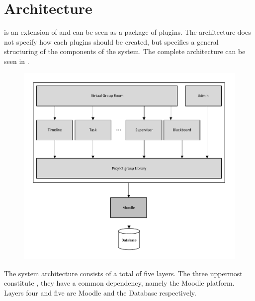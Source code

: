 \section{Architecture}
\label{sec:architecture}
\system{} is an extension of \moodle{} and can be seen as a package of plugins. 
The architecture does not specify how each plugins should be created, but specifies a general structuring of the components of the system. 
The complete architecture can be seen in .
\begin{figure}[h!t]
	\centering
		\includegraphics[width=\textwidth]{images/architecture.pdf}
	\label{fig:architecture}
\end{figure}

The system architecture consists of a total of five layers. 
The three uppermost constitute \system{}, they have a common dependency, namely the Moodle platform. 
Layers four and five are Moodle and the Database respectively.

